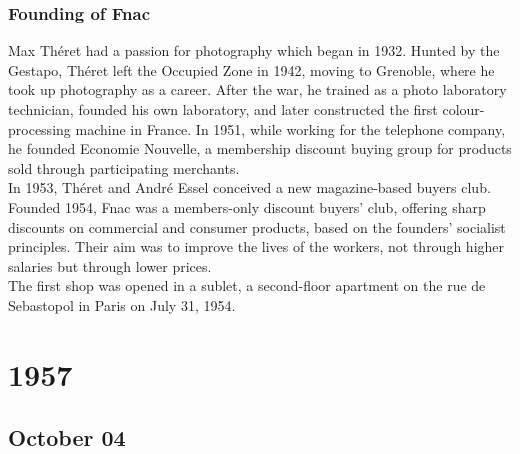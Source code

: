\documentclass[11pt]{report}
\begin{document}
\subsection{Founding of Fnac}
Max Théret had a passion for photography which began in 1932. Hunted by the Gestapo, Théret left the Occupied Zone in 1942, moving to Grenoble, where he took up photography as a career. After the war, he trained as a photo laboratory technician, founded his own laboratory, and later constructed the first colour-processing machine in France. In 1951, while working for the telephone company, he founded Economie Nouvelle, a membership discount buying group for products sold through participating merchants.\\ \indent In 1953, Théret and André Essel conceived a new magazine-based buyers club. Founded 1954, Fnac was a members-only discount buyers' club, offering sharp discounts on commercial and consumer products, based on the founders' socialist principles. Their aim was to improve the lives of the workers, not through higher salaries but through lower prices.\\
\indent The first shop was opened in a sublet, a second-floor apartment on the rue de Sebastopol in Paris on July 31, 1954.

\chapter{1957}
\section{October 04}
\end{document}

